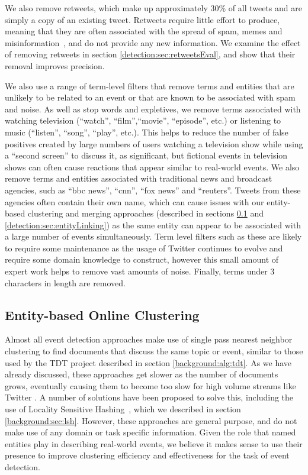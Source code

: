We also remove retweets, which make up approximately 30\% of all tweets and are simply a copy of an existing tweet.
Retweets require little effort to produce, meaning that they are often associated with the spread of spam, memes and misinformation~\citep{Grier:2010:SUC:1866307.1866311}, and do not provide any new information.
We examine the effect of removing retweets in section \ref{detection:sec:retweetsEval}, and show that their removal improves precision.

We also use a range of term-level filters that remove terms and entities that are unlikely to be related to an event or that are known to be associated with spam and noise.
As well as stop words and expletives, we remove terms associated with watching television (``watch'', ``film'',``movie'', ``episode'', etc.) or listening to music (``listen'', ``song'', ``play'', etc.).
This helps to reduce the number of false positives created by large numbers of users watching a television show while using a ``second screen'' to discuss it, as significant, but fictional events in television shows can often cause reactions that appear similar to real-world events.
We also remove terms and entities associated with traditional news and broadcast agencies, such as ``bbc news'', ``cnn'', ``fox news'' and ``reuters''.
Tweets from these agencies often contain their own name, which can cause issues with our entity-based clustering and merging approaches (described in sections \ref{detection:sec:clustering} and \ref{detection:sec:entityLinking}) as the same entity can appear to be associated with a large number of events simultaneously.
Term level filters such as these are likely to require some maintenance as the usage of Twitter continues to evolve and require some domain knowledge to construct, however this small amount of expert work helps to remove vast amounts of noise.
Finally, terms under 3 characters in length are removed.

\subsection{Entity-based Online Clustering}
\label{detection:sec:clustering}
Almost all event detection approaches make use of single pass nearest neighbor clustering to find documents that discuss the same topic or event, similar to those used by the TDT project described in section \ref{background:alg:tdt}.
As we have already discussed, these approaches get slower as the number of documents grows, eventually causing them to become too slow for high volume streams like Twitter \citep{Petrovic10}.
A number of solutions have been proposed to solve this, including the use of Locality Sensitive Hashing~\citep{Petrovic10}, which we described in section \ref{background:sec:lsh}.
However, these approaches are general purpose, and do not make use of any domain or task specific information.
Given the role that named entities play in describing real-world events, we believe it makes sense to use their presence to improve clustering efficiency and effectiveness for the task of event detection.

